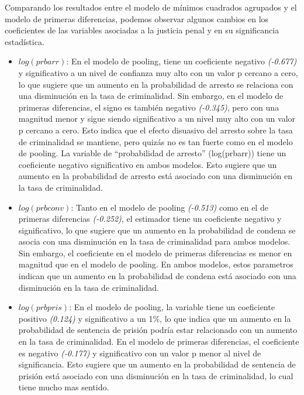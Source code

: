 \documentclass[
  12pt,
]{article}
\begin{document}
Comparando los resultados entre el modelo de mínimos cuadrados agrupados
y el modelo de primeras diferencias, podemos observar algunos cambios en
los coeficientes de las variables asociadas a la justicia penal y en su
significancia estadística.

\begin{itemize}
\item
  \(log(prbarr)\): En el modelo de pooling, tiene un coeficiente
  negativo \emph{(-0.677)} y significativo a un nivel de confianza muy
  alto con un valor p cercano a cero, lo que sugiere que un aumento en
  la probabilidad de arresto se relaciona con una disminución en la tasa
  de criminalidad. Sin embargo, en el modelo de primeras diferencias, el
  signo es también negativo \emph{(-0.345)}, pero con una magnitud menor
  y sigue siendo significativo a un nivel muy alto con un valor p
  cercano a cero. Esto indica que el efecto disuasivo del arresto sobre
  la tasa de criminalidad se mantiene, pero quizás no es tan fuerte como
  en el modelo de pooling. La variable de ``probabilidad de arresto''
  (log(prbarr)) tiene un coeficiente negativo significativo en ambos
  modelos. Esto sugiere que un aumento en la probabilidad de arresto
  está asociado con una disminución en la tasa de criminalidad.
\item
  \(log(prbconv)\): Tanto en el modelo de pooling \emph{(-0.513)} como
  en el de primeras diferencias \emph{(-0.252)}, el estimador tiene un
  coeficiente negativo y significativo, lo que sugiere que un aumento en
  la probabilidad de condena se asocia con una disminución en la tasa de
  criminalidad para ambos modelos. Sin embargo, el coeficiente en el
  modelo de primeras diferencias es menor en magnitud que en el modelo
  de pooling. En ambos modelos, estos parametros indican que un aumento
  en la probabilidad de condena está asociado con una disminución en la
  tasa de criminalidad.
\item
  \(log(prbpris)\): En el modelo de pooling, la variable tiene un
  coeficiente positivo \emph{(0.124)} y significativo a un 1\%, lo que
  indica que un aumento en la probabilidad de sentencia de prisión
  podría estar relacionado con un aumento en la tasa de criminalidad. En
  el modelo de primeras diferencias, el coeficiente es negativo
  \emph{(-0.177)} y significativo con un valor p menor al nivel de
  significancia. Esto sugiere que un aumento en la probabilidad de
  sentencia de prisión está asociado con una disminución en la tasa de
  criminalidad, lo cual tiene mucho mas sentido.
\end{itemize}
\end{document}

